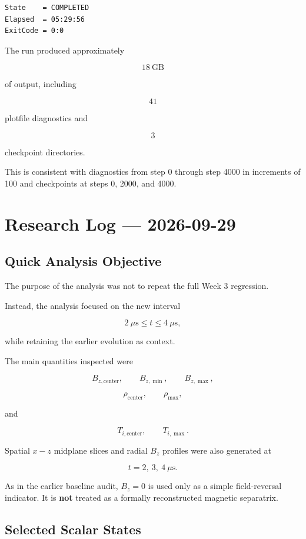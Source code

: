 \documentclass[11pt,a4paper]{article}
\begin{document}
\begin{lstlisting}
State    = COMPLETED
Elapsed  = 05:29:56
ExitCode = 0:0
\end{lstlisting}

The run produced approximately

\[
18~\mathrm{GB}
\]

of output, including

\[
41
\]

plotfile diagnostics and

\[
3
\]

checkpoint directories.

This is consistent with diagnostics from step 0 through step 4000 in
increments of 100 and checkpoints at steps 0, 2000, and 4000.

\section{Research Log --- 2026-09-29}

\subsection{Quick Analysis Objective}

The purpose of the analysis was not to repeat the full Week 3 regression.

Instead, the analysis focused on the new interval

\[
2~\mu\mathrm{s}
\leq t
\leq
4~\mu\mathrm{s},
\]

while retaining the earlier evolution as context.

The main quantities inspected were

\[
B_{z,\mathrm{center}},
\qquad
B_{z,\min},
\qquad
B_{z,\max},
\]

\[
\rho_{\mathrm{center}},
\qquad
\rho_{\max},
\]

and

\[
T_{i,\mathrm{center}},
\qquad
T_{i,\max}.
\]

Spatial \(x-z\) midplane slices and radial \(B_z\) profiles were also generated
at

\[
t=2,\ 3,\ 4~\mu\mathrm{s}.
\]

As in the earlier baseline audit, \(B_z=0\) is used only as a simple
field-reversal indicator. It is \textbf{not} treated as a formally reconstructed
magnetic separatrix.

\subsection{Selected Scalar States}
\end{document}
